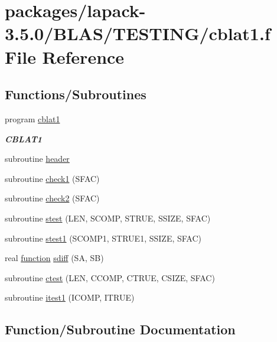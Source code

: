 \hypertarget{cblat1_8f}{}\section{packages/lapack-\/3.5.0/\+B\+L\+A\+S/\+T\+E\+S\+T\+I\+N\+G/cblat1.f File Reference}
\label{cblat1_8f}
\subsection*{Functions/\+Subroutines}
\begin{DoxyCompactItemize}
\item 
program \hyperlink{group__complex__blas__testing_ga1745796608c811cc70e40317f3bdacc1}{cblat1}
\begin{DoxyCompactList}\small\item\em {\bfseries C\+B\+L\+A\+T1} \end{DoxyCompactList}\item 
subroutine \hyperlink{cblat1_8f_a410931b600854e6dd3e253731606117e}{header}
\item 
subroutine \hyperlink{cblat1_8f_a87cda69493417357e26ad280bc547317}{check1} (S\+F\+A\+C)
\item 
subroutine \hyperlink{cblat1_8f_a9ff9298afee60deb7ffaea43a6d1b668}{check2} (S\+F\+A\+C)
\item 
subroutine \hyperlink{cblat1_8f_a077aa8449e1055cdecdebf7cb41738a5}{stest} (L\+E\+N, S\+C\+O\+M\+P, S\+T\+R\+U\+E, S\+S\+I\+Z\+E, S\+F\+A\+C)
\item 
subroutine \hyperlink{cblat1_8f_ab395702962b4ce31a8b18ae8c74d7f97}{stest1} (S\+C\+O\+M\+P1, S\+T\+R\+U\+E1, S\+S\+I\+Z\+E, S\+F\+A\+C)
\item 
real \hyperlink{afunc_8m_a7b5e596df91eadea6c537c0825e894a7}{function} \hyperlink{cblat1_8f_a493e960a0792ad29e73d02d04c77ca29}{sdiff} (S\+A, S\+B)
\item 
subroutine \hyperlink{cblat1_8f_aefe3dd8c590960cceacbe19f55ff769c}{ctest} (L\+E\+N, C\+C\+O\+M\+P, C\+T\+R\+U\+E, C\+S\+I\+Z\+E, S\+F\+A\+C)
\item 
subroutine \hyperlink{cblat1_8f_af82694537a350a6cb3615ece843dcede}{itest1} (I\+C\+O\+M\+P, I\+T\+R\+U\+E)
\end{DoxyCompactItemize}


\subsection{Function/\+Subroutine Documentation}
\hypertarget{cblat1_8f_a87cda69493417357e26ad280bc547317}{}
